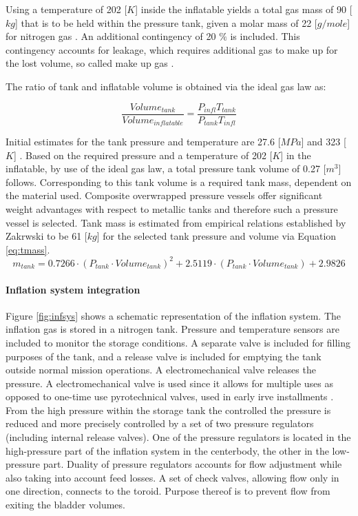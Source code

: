 Using a temperature of 202 [$K$] inside the inflatable yields a total gas mass of 90 [$kg$] that is to be held within the pressure tank, given a molar mass of 22 [$g/mole$] for nitrogen gas \cite{Samareh2011}. An additional contingency of 20 $\%$ is included. This contingency accounts for leakage, which requires additional gas to make up for the lost volume, so called make up gas \cite{Jenkins2001}.

The ratio of tank and inflatable volume is obtained via the ideal gas law as:

\begin{equation}
\frac{Volume_{tank}}{Volume_{inflatable}} = \frac{P_{infl}T_{tank}}{P_{tank}T_{infl}}
\label{eq:volratio}
\end{equation}

Initial estimates for the tank pressure and temperature are 27.6 [$MPa$] and 323 [$K$] \cite[p.545]{Wertz2011}. Based on the required pressure and a temperature of 202 [$K$] in the inflatable, by use of the ideal gas law, a total pressure tank volume of 0.27 [$m^{3}$] follows. Corresponding to this tank volume is a required tank mass, dependent on the material used. Composite overwrapped pressure vessels offer significant weight advantages with respect to metallic tanks and therefore such a pressure vessel is selected. Tank mass is estimated from empirical relations established by Zakrwski \cite[p.546]{Wertz2011} to be 61 [$kg$] for the selected tank pressure and volume via Equation \ref{eq:tmass}.
\begin{equation}
m_{tank} = 0.7266 \cdot (P_{tank} \cdot Volume_{tank})^{2} + 2.5119 \cdot (P_{tank} \cdot Volume_{tank}) + 2.9826
\label{eq:tmass}
\end{equation}

\paragraph{Inflation system integration}


Figure \ref{fig:infsys} shows a schematic representation of the inflation system. The inflation gas is stored in a nitrogen tank. Pressure and temperature sensors are included to monitor the storage conditions. A separate valve is included for filling purposes of the tank, and a release valve is included for emptying the tank outside normal mission operations. A electromechanical valve releases the pressure. A electromechanical valve is used since it allows for multiple uses as opposed to one-time use pyrotechnical valves, used in early \gls{irve} installments \cite{Hughes2005}. From the high pressure within the storage tank the controlled the pressure is reduced and more precisely controlled by a set of two pressure regulators (including internal release valves). One of the pressure regulators is located in the high-pressure part of the inflation system in the centerbody, the other in the low-pressure part. Duality of pressure regulators accounts for flow adjustment while also taking into account feed losses. A set of check valves, allowing flow only in one direction, connects to the toroid. Purpose thereof is to prevent flow from exiting the bladder volumes. 

